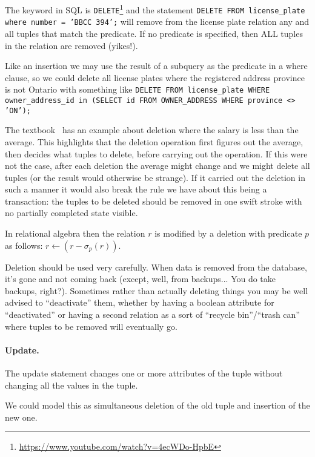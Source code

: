 The keyword in SQL is \texttt{DELETE}\footnote{\url{https://www.youtube.com/watch?v=4ecWDo-HpbE}} and the statement \texttt{DELETE FROM license\_plate where number = 'BBCC 394';} will remove from the license plate relation any and all tuples that match the predicate. If no predicate is specified, then ALL tuples in the relation are removed (yikes!).

Like an insertion we may use the result of a subquery as the predicate in a where clause, so we could delete all license plates where the registered address province is not Ontario with something like \texttt{DELETE FROM license\_plate WHERE owner\_address\_id in (SELECT id FROM OWNER\_ADDRESS WHERE province <> 'ON');}

The textbook~\cite{dsc} has an example about deletion where the salary is less than the average. This highlights that the deletion operation first figures out the average, then decides what tuples to delete, before carrying out the operation. If this were not the case, after each deletion the average might change and we might delete all tuples (or the result would otherwise be strange). If it carried out the deletion in such a manner it would also break the rule we have about this being a transaction: the tuples to be deleted should be removed in one swift stroke with no partially completed state visible.

In relational algebra then the relation $r$ is modified by a deletion with predicate $p$ as follows: $r \leftarrow (r - \sigma_{p}( r ) )$.

Deletion should be used very carefully. When data is removed from the database, it's gone and not coming back (except, well, from backups... You do take backups, right?). Sometimes rather than actually deleting things you may be well advised to ``deactivate'' them, whether by having a boolean attribute for ``deactivated'' or having a second relation as a sort of ``recycle bin''/``trash can'' where tuples to be removed will eventually go.

\paragraph{Update.} 
The update statement changes one or more attributes of the tuple without changing all the values in the tuple. 

We could model this as simultaneous deletion of the old tuple and insertion of the new one.





